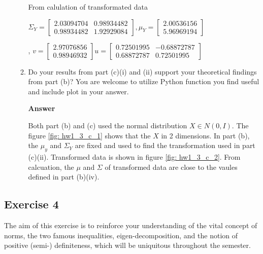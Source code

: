 \documentclass[11pt]{article}
\begin{document}
\begin{enumerate}[label=(\alph*)]
\begin{enumerate}[label=(\roman*)]
From calulation of transformated data

$\Sigma_Y = 
\begin{bmatrix}
2.03094704 & 0.98934482\\
0.98934482 & 1.92929084
\end{bmatrix}
, \mu_Y =
\begin{bmatrix}
2.00536156\\
5.96969194
\end{bmatrix} 
$

, $v =
\begin{bmatrix}
2.97076856 \\
0.98946932
\end{bmatrix}
u = 
\begin{bmatrix}
0.72501995 &-0.68872787\\
0.68872787 & 0.72501995
\end{bmatrix}
$

\item Do your results from part (c)(i) and (ii) support your theoretical findings from part (b)? You are welcome to utilize Python function you find useful and include plot in your answer.

\noindent\textbf{Answer}

Both part (b) and (c) used the normal distribution $X \in N(0, I)$. The figure \ref{fig: hw1_3_c_1} shows that the $X$ in 2 dimensions. In part (b), the $\mu_y$ and $\Sigma_Y$ are fixed and used to find the transformation used in part (c)(ii). 
Transformed data is shown in figure \ref{fig: hw1_3_c_2}. From calcuation, the $\mu$ and $\Sigma$ of transformed data are close to the vaules defined in part (b)(iv).

\end{enumerate}

\end{enumerate}

\subsection*{Exercise 4}

The aim of this exercise is to reinforce your understanding of the vital concept of norms, the two famous inequalities, eigen-decomposition, and the notion of positive (semi-) definiteness, which will be uniquitous throughout the semester.
\end{document}
